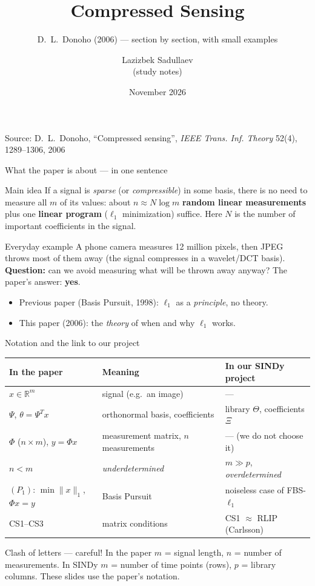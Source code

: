 \documentclass[aspectratio=169,11pt]{beamer}
\title[Compressed Sensing: study notes]{Compressed Sensing}
\subtitle{D.~L.~Donoho (2006) --- section by section, with small examples}
\author[L. Sadullaev]{Lazizbek Sadullaev \\ {\small (study notes)}}
\institute[WSU]{Department of Mathematics and Statistics, Washington State University}
\date{November 2026}
\newcommand{\en}[1]{\textit{#1}}          %
\newcommand{\norm}[1]{\lVert #1\rVert}
\begin{document}
\begin{frame}
  \titlepage
  \centering\footnotesize
  Source: D.~L.~Donoho, ``Compressed sensing'', \emph{IEEE Trans. Inf. Theory} 52(4), 1289--1306, 2006
\end{frame}


\begin{frame}{What the paper is about --- in one sentence}
  \begin{block}{Main idea}
    If a signal is \en{sparse} (or \en{compressible}) in some basis, there is no need to measure all $m$ of its values:
    about $n\approx N\log m$ \textbf{random linear measurements} plus one \textbf{linear program} ($\ell_1$ minimization)
    suffice. Here $N$ is the number of important coefficients in the signal.
  \end{block}
  \begin{exampleblock}{Everyday example}
    A phone camera measures 12 million pixels, then JPEG throws most of them away (the signal compresses in a wavelet/DCT basis).
    \textbf{Question:} can we avoid measuring what will be thrown away anyway? The paper's answer: \textbf{yes}.
  \end{exampleblock}
  \begin{itemize}
    \item Previous paper (Basis Pursuit, 1998): $\ell_1$ as a \emph{principle}, no theory.
    \item This paper (2006): the \emph{theory} of when and why $\ell_1$ works.
  \end{itemize}
\end{frame}

\begin{frame}{Notation and the link to our project}
  \centering\small
  \begin{tabular}{@{}lll@{}}
    \toprule
    \textbf{In the paper} & \textbf{Meaning} & \textbf{In our SINDy project} \\
    \midrule
    $x\in\mathbb{R}^m$ & signal (e.g.\ an image) & --- \\
    $\Psi$, $\theta=\Psi^Tx$ & orthonormal basis, coefficients & library $\Theta$, coefficients $\Xi$ \\
    $\Phi$ ($n\times m$), $y=\Phi x$ & measurement matrix, $n$ measurements & --- (we do not choose it) \\
    $n<m$ & \en{underdetermined} & $m\gg p$, \en{overdetermined} \\
    $(P_1)$: $\min\norm{x}_1$, $\Phi x=y$ & Basis Pursuit & noiseless case of FBS-$\ell_1$ \\
    CS1--CS3 & matrix conditions & CS1 $\approx$ RLIP (Carlsson) \\
    \bottomrule
  \end{tabular}
  \medskip

  \raggedright
  \begin{alertblock}{Clash of letters --- careful!}
    In the paper $m$ = signal length, $n$ = number of measurements. In SINDy $m$ = number of time points (rows), $p$ = library columns.
    These slides use the paper's notation.
  \end{alertblock}
\end{frame}
\end{document}
